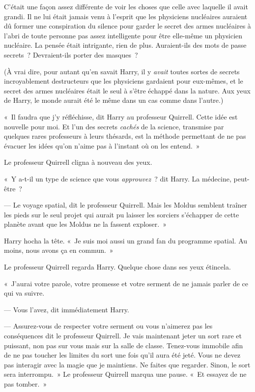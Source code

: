 C'était une façon assez différente de voir les choses que celle avec laquelle il avait grandi.
Il ne lui était jamais venu à l'esprit que les physiciens nucléaires auraient dû former une conspiration du silence pour garder le secret des armes nucléaires à l'abri de toute personne pas assez intelligente pour être elle-même un physicien nucléaire.
La pensée était intrigante, rien de plus.
Auraient-ils des mots de passe secrets~?
Devraient-ils porter des masques~?

(À vrai dire, pour autant qu'en savait Harry, il y \emph{avait} toutes sortes de secrets incroyablement destructeurs que les physiciens gardaient pour eux-mêmes, et le secret des armes nucléaires était le seul à s'être échappé dans la nature.
Aux yeux de Harry, le monde aurait été le même dans un cas comme dans l'autre.)

«~Il faudra que j'y réfléchisse, dit Harry au professeur Quirrell.
Cette idée est nouvelle pour moi.
Et l'un des secrets \emph{cachés} de la science, transmise par quelques rares professeurs à leurs thésards, est la méthode permettant de ne pas évacuer les idées qu'on n'aime pas à l'instant où on les entend.~»

Le professeur Quirrell cligna à nouveau des yeux.

«~Y a-t-il un type de science que vous \emph{approuvez}~? dit Harry.
La médecine, peut-être~?

--- Le voyage spatial, dit le professeur Quirrell.
Mais les Moldus semblent traîner les pieds sur le seul projet qui aurait pu laisser les sorciers s'échapper de cette planète avant que les Moldus ne la fassent exploser.~»

Harry hocha la tête.
«~Je suis moi aussi un grand fan du programme spatial.
Au moins, nous avons ça en commun.~»

Le professeur Quirrell regarda Harry.
Quelque chose dans ses yeux étincela.

«~J'aurai votre parole, votre promesse et votre serment de ne jamais parler de ce qui va suivre.

--- Vous l'avez, dit immédiatement Harry.

--- Assurez-vous de respecter votre serment ou vous n'aimerez pas les conséquences dit le professeur Quirrell.
Je vais maintenant jeter un sort rare et puissant, non pas sur vous mais sur la salle de classe.
Tenez-vous immobile afin de ne pas toucher les limites du sort une fois qu'il aura été jeté.
Vous ne devez pas interagir avec la magie que je maintiens.
Ne faites que regarder.
Sinon, le sort sera interrompu.~»
Le professeur Quirrell marqua une pause.
«~Et essayez de ne pas tomber.~»

